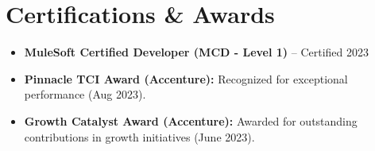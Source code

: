 \documentclass[letterpaper,10pt]{article}
\begin{document}
\section*{Certifications \& Awards}
    \begin{itemize}[leftmargin=*] \itemsep 0pt
        \item \textbf{MuleSoft Certified Developer (MCD - Level 1)} -- Certified 2023
        \item \textbf{Pinnacle TCI Award (Accenture):} Recognized for exceptional performance (Aug 2023).
        \item \textbf{Growth Catalyst Award (Accenture):} Awarded for outstanding contributions in growth initiatives (June 2023).
    \end{itemize}
\end{document}
